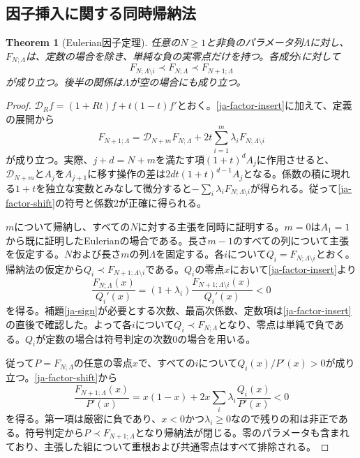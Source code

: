 \documentclass[12pt]{amsart}
\newtheorem{thm}{Theorem}[section]
\theoremstyle{definition}
\theoremstyle{remark}
\numberwithin{equation}{section}
\begin{document}
\subsection{因子挿入に関する同時帰納法}
\begin{samepage}
\begin{thm}[Eulerian因子定理]\label{ja-factor-theorem}
任意の$N\geq1$と非負のパラメータ列$\Lambda$に対し、$F_{N;\Lambda}$は、定数の場合を除き、単純な負の実零点だけを持つ。各成分$i$に対して
\[
 F_{N;\Lambda\setminus i}\prec F_{N;\Lambda}
 \prec F_{N+1;\Lambda}
\]
が成り立つ。後半の関係は$\Lambda$が空の場合にも成り立つ。
\end{thm}
\end{samepage}
\begin{proof}
$\mathcal D_R f=(1+Rt)f+t(1-t)f'$とおく。\eqref{ja-factor-insert}に加えて、定義の展開から
\begin{equation}\label{ja-factor-shift}
 F_{N+1;\Lambda}=\mathcal D_{N+m}F_{N;\Lambda}
                +2t\sum_{i=1}^m\lambda_i F_{N;\Lambda\setminus i}
\end{equation}
が成り立つ。実際、$j+d=N+m$を満たす項$(1+t)^dA_j$に作用させると、$\mathcal D_{N+m}$と$A_j$を$A_{j+1}$に移す操作の差は$2dt(1+t)^{d-1}A_j$となる。係数の積に現れる$1+t$を独立な変数とみなして微分すると$-\sum_i\lambda_iF_{N;\Lambda\setminus i}$が得られる。従って\eqref{ja-factor-shift}の符号と係数2が正確に得られる。

$m$について帰納し、すべての$N$に対する主張を同時に証明する。$m=0$は$A_1=1$から既に証明したEulerianの場合である。長さ$m-1$のすべての列について主張を仮定する。$N$および長さ$m$の列$\Lambda$を固定する。各$i$について$Q_i=F_{N;\Lambda\setminus i}$とおく。帰納法の仮定から$Q_i\prec F_{N+1;\Lambda\setminus i}$である。$Q_i$の零点$x$において\eqref{ja-factor-insert}より
\[
 \frac{F_{N;\Lambda}(x)}{Q_i'(x)}
 =(1+\lambda_i)\frac{F_{N+1;\Lambda\setminus i}(x)}{Q_i'(x)}<0
\]
を得る。補題\ref{ja-sign}が必要とする次数、最高次係数、定数項は\eqref{ja-factor-insert}の直後で確認した。よって各$i$について$Q_i\prec F_{N;\Lambda}$となり、零点は単純で負である。$Q_i$が定数の場合は符号判定の次数0の場合を用いる。

従って$P=F_{N;\Lambda}$の任意の零点$x$で、すべての$i$について$Q_i(x)/P'(x)>0$が成り立つ。\eqref{ja-factor-shift}から
\[
 \frac{F_{N+1;\Lambda}(x)}{P'(x)}
 =x(1-x)+2x\sum_i\lambda_i\frac{Q_i(x)}{P'(x)}<0
\]
を得る。第一項は厳密に負であり、$x<0$かつ$\lambda_i\geq0$なので残りの和は非正である。符号判定から$P\prec F_{N+1;\Lambda}$となり帰納法が閉じる。零のパラメータも含まれており、主張した組について重根および共通零点はすべて排除される。
\end{proof}
\end{document}
